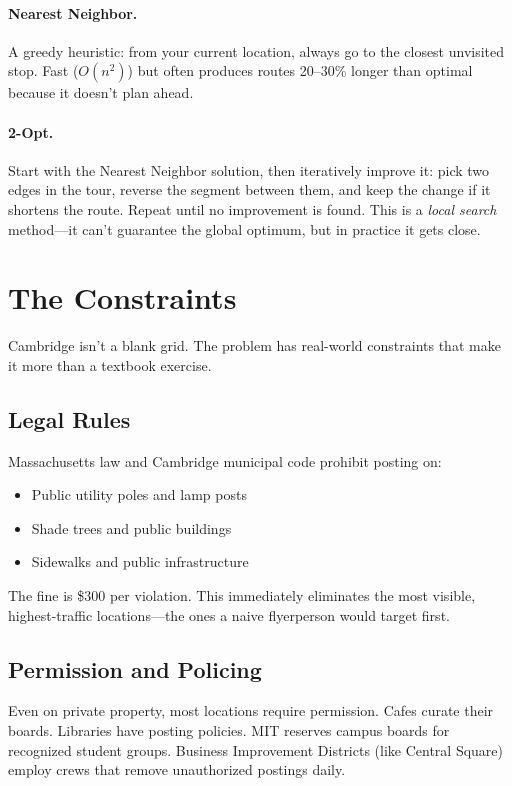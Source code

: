 \documentclass[sigconf,nonacm]{acmart}
\begin{document}
\paragraph{Nearest Neighbor.} A greedy heuristic: from your current location, always go to the closest unvisited stop. Fast ($O(n^2)$) but often produces routes 20--30\% longer than optimal because it doesn't plan ahead.

\paragraph{2-Opt.} Start with the Nearest Neighbor solution, then iteratively improve it: pick two edges in the tour, reverse the segment between them, and keep the change if it shortens the route. Repeat until no improvement is found. This is a \emph{local search} method---it can't guarantee the global optimum, but in practice it gets close.

\section{The Constraints}

Cambridge isn't a blank grid. The problem has real-world constraints that make it more than a textbook exercise.

\subsection{Legal Rules}

Massachusetts law and Cambridge municipal code prohibit posting on:
\begin{itemize}
    \item Public utility poles and lamp posts
    \item Shade trees and public buildings
    \item Sidewalks and public infrastructure
\end{itemize}
The fine is \$300 per violation. This immediately eliminates the most visible, highest-traffic locations---the ones a naive flyerperson would target first.

\subsection{Permission and Policing}

Even on private property, most locations require permission. Cafes curate their boards. Libraries have posting policies. MIT reserves campus boards for recognized student groups. Business Improvement Districts (like Central Square) employ crews that remove unauthorized postings daily.
\end{document}
